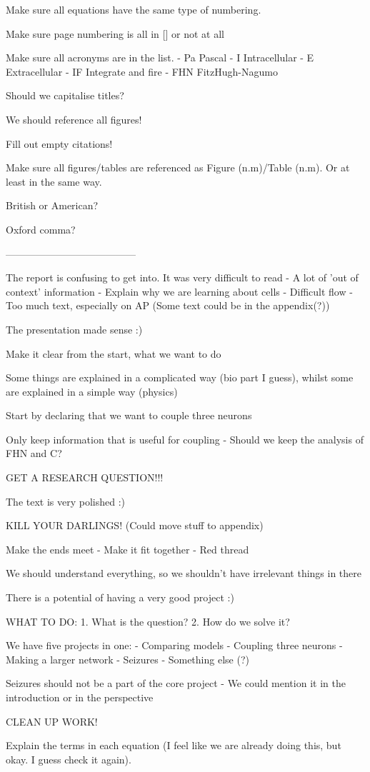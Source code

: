 Make sure all equations have the same type of numbering.

Make sure page numbering is all in [] or not at all

Make sure all acronyms are in the list.
    - Pa    Pascal
    - I     Intracellular
    - E     Extracellular
    - IF    Integrate and fire
    - FHN   FitzHugh-Nagumo

Should we capitalise titles?

We should reference all figures!

Fill out empty citations!

Make sure all figures/tables are referenced as Figure (n.m)/Table (n.m). Or at least in the same way.

British or American?

Oxford comma?

---------------------------------------

The report is confusing to get into. It was very difficult to read
    - A lot of 'out of context' information
    - Explain why we are learning about cells
    - Difficult flow
    - Too much text, especially on AP (Some text could be in    the appendix(?))

The presentation made sense :)

Make it clear from the start, what we want to do

Some things are explained in a complicated way (bio part I guess), whilst some are explained in a simple way (physics)

Start by declaring that we want to couple three neurons 

Only keep information that is useful for coupling
    - Should we keep the analysis of FHN and C?

GET A RESEARCH QUESTION!!!

The text is very polished :)

KILL YOUR DARLINGS! (Could move stuff to appendix)

Make the ends meet
    - Make it fit together 
    - Red thread

We should understand everything, so we shouldn't have irrelevant things in there

There is a potential of having a very good project :)

WHAT TO DO:
    1. What is the question?
    2. How do we solve it?

We have five projects in one:
    - Comparing models
    - Coupling three neurons
    - Making a larger network
    - Seizures
    - Something else (?)

Seizures should not be a part of the core project
    - We could mention it in the introduction or in the         perspective 

CLEAN UP WORK!

Explain the terms in each equation (I feel like we are already doing this, but okay. I guess check it again).